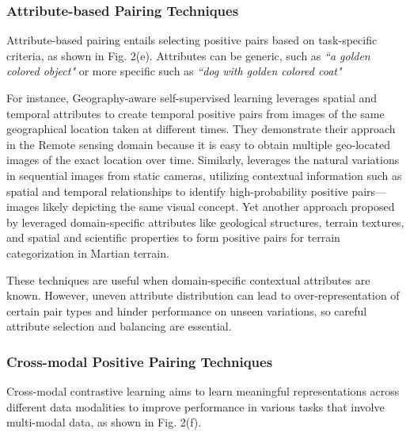\subsubsection{Attribute-based Pairing Techniques}

Attribute-based pairing entails selecting positive pairs based on task-specific criteria, as shown in Fig. 2(e). Attributes can be generic, such as \textit{``a golden colored object"} or more specific such as \textit{``dog with golden colored coat"}

For instance, Geography-aware self-supervised learning \cite{ayush2021geography} leverages spatial and temporal attributes to create temporal positive pairs from images of the same geographical location taken at different times. They demonstrate their approach in the Remote sensing domain because it is easy to obtain multiple geo-located images of the exact location over time. Similarly, \cite{pantazis2021focus} leverages the natural variations in sequential images from static cameras, utilizing contextual information such as spatial and temporal relationships to identify high-probability positive pairs—images likely depicting the same visual concept. Yet another approach proposed by \cite{panambur2022self} leveraged domain-specific attributes like geological structures, terrain textures, and spatial and scientific properties to form positive pairs for terrain categorization in Martian terrain.

These techniques are useful when domain-specific contextual attributes are known. However, uneven attribute distribution can lead to over-representation of certain pair types and hinder performance on unseen variations, so careful attribute selection and balancing are essential.

\subsubsection{Cross-modal Positive Pairing Techniques}
Cross-modal contrastive learning aims to learn meaningful representations across different data modalities  to improve performance in various tasks that involve multi-modal data,
as shown in Fig. 2(f). 

